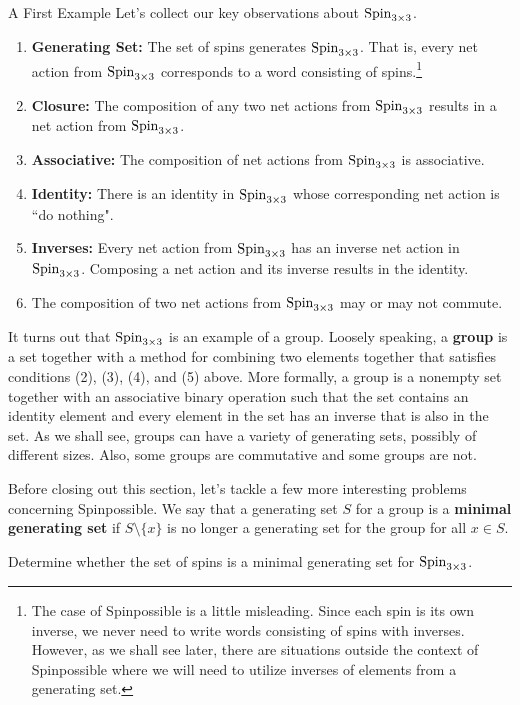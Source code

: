 \begin{section}{A First Example}
Let's collect our key observations about $\operatorname{Spin}_{3\times 3}$.
\begin{enumerate}[label=\rm{(\arabic*)}]
\item \textbf{Generating Set:} The set of spins generates $\operatorname{Spin}_{3\times 3}$.  That is, every net action from $\operatorname{Spin}_{3\times 3}$ corresponds to a word consisting of spins.\footnote{The case of Spinpossible is a little misleading. Since each spin is its own inverse, we never need to write words consisting of spins with inverses. However, as we shall see later, there are situations outside the context of Spinpossible where we will need to utilize inverses of elements from a generating set.} 
\item \textbf{Closure:} The composition of any two net actions from $\operatorname{Spin}_{3\times 3}$ results in a net action from $\operatorname{Spin}_{3\times 3}$.
\item \textbf{Associative:} The composition of net actions from $\operatorname{Spin}_{3\times 3}$ is associative.
\item \textbf{Identity:} There is an identity in $\operatorname{Spin}_{3\times 3}$ whose corresponding net action is ``do nothing".
\item \textbf{Inverses:} Every net action from $\operatorname{Spin}_{3\times 3}$ has an inverse net action in $\operatorname{Spin}_{3\times 3}$. Composing a net action and its inverse results in the identity.
\item The composition of two net actions from $\operatorname{Spin}_{3\times 3}$ may or may not commute.
\end{enumerate}

It turns out that $\operatorname{Spin}_{3\times 3}$ is an example of a group. Loosely speaking, a \textbf{group} is a set together with a method for combining two elements together that satisfies conditions (2), (3), (4), and (5) above.  More formally, a group is a nonempty set together with an associative binary operation such that the set contains an identity element and every element in the set has an inverse that is also in the set.  As we shall see, groups can have a variety of generating sets, possibly of different sizes. Also, some groups are commutative and some groups are not.

Before closing out this section, let's tackle a few more interesting problems concerning Spinpossible. We say that a generating set $S$ for a group is a \textbf{minimal generating set} if $S\setminus\{x\}$ is no longer a generating set for the group for all $x\in S$.

\begin{problem}
Determine whether the set of spins is a minimal generating set for $\operatorname{Spin}_{3\times 3}$.
\end{problem}


\end{section}
